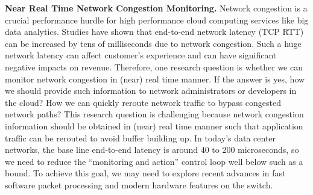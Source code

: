 {\bf Near Real Time Network Congestion Monitoring.}
Network congestion is a crucial performance hurdle for high performance cloud computing services like big data analytics.
Studies have shown that end-to-end network latency (TCP RTT) can be increased by tens of milliseconds due to network congestion. Such a huge network latency can affect customer's experience and can have significant negative impacts on revenue.
Therefore, one research question is whether we can monitor network congestion in (near) real time manner.
If the answer is yes, how we should provide such information to network administrators or developers
in the cloud? How we can quickly reroute network traffic to bypass congested network paths?
This research question is challenging because network congestion information should be obtained in
(near) real time manner such that application traffic can be rerouted to avoid buffer building up.
In today's data center networks, the base line end-to-end latency is around 40 to
200 microseconds, so we need to reduce the ``monitoring and action''
control loop well below such as a bound.
To achieve this goal, we may need to explore recent advances in fast software packet processing and
modern hardware features on the switch.
